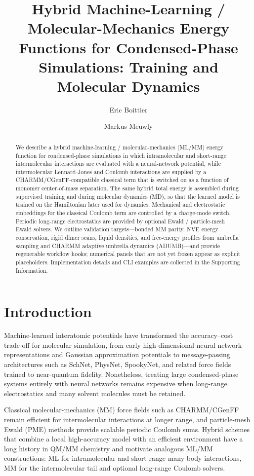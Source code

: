 \documentclass[journal=jctc,manuscript=article]{achemso}
\author{Eric Boittier}
\affiliation{Department of Chemistry, University of Basel, Klingelbergstrasse 80, CH-4056 Basel, Switzerland}
\author{Markus Meuwly}
\affiliation{Department of Chemistry, University of Basel, Klingelbergstrasse 80, CH-4056 Basel, Switzerland}
\title{Hybrid Machine-Learning / Molecular-Mechanics Energy Functions for Condensed-Phase Simulations: Training and Molecular Dynamics}
\begin{document}
\begin{abstract}
We describe a hybrid machine-learning / molecular-mechanics (ML/MM) energy
function for condensed-phase simulations in which intramolecular and
short-range intermolecular interactions are evaluated with a neural-network
potential, while intermolecular Lennard-Jones and Coulomb interactions are
supplied by a CHARMM/CGenFF-compatible classical term that is switched on as a
function of monomer center-of-mass separation. The same hybrid total energy is
assembled during supervised training and during molecular dynamics (MD), so
that the learned model is trained on the Hamiltonian later used for dynamics.
Mechanical and electrostatic embeddings for the classical Coulomb term are
controlled by a charge-mode switch. Periodic long-range electrostatics are
provided by optional Ewald / particle-mesh Ewald solvers. We outline validation
targets---bonded MM parity, NVE energy conservation, rigid dimer scans, liquid
densities, and free-energy profiles from umbrella sampling and CHARMM adaptive
umbrella dynamics (ADUMB)---and provide regenerable workflow hooks; numerical
panels that are not yet frozen appear as explicit placeholders. Implementation
details and CLI examples are collected in the Supporting Information.
\end{abstract}

\tableofcontents
\clearpage

\section{Introduction}

Machine-learned interatomic potentials have transformed the accuracy--cost
trade-off for molecular simulation, from early high-dimensional neural network
representations\cite{Behler2007,Behler2021} and Gaussian approximation
potentials\cite{Bartok2010,Deringer2021} to message-passing architectures such
as SchNet,\cite{Schutt2018} PhysNet,\cite{Unke2019PhysNet}
SpookyNet,\cite{Unke2021SpookyNet} and related force fields trained to
near-quantum fidelity.\cite{Chmiela2018,Unke2021ChemRev,Keith2021,Ko2021}
Nonetheless, treating large condensed-phase systems entirely with neural
networks remains expensive when long-range electrostatics and many solvent
molecules must be retained.

Classical molecular-mechanics (MM) force fields such as
CHARMM/CGenFF\cite{Brooks2009CHARMM,Vanommeslaeghe2010,Mackerell2004} remain
efficient for intermolecular interactions at longer range, and
particle-mesh Ewald (PME) methods provide scalable periodic
Coulomb sums.\cite{Ewald1921,Darden1993,Essmann1995} Hybrid schemes that
combine a local high-accuracy model with an efficient environment have a long
history in QM/MM chemistry\cite{Warshel1976,Senn2009,Lin2014} and motivate
analogous ML/MM constructions: ML for intramolecular and short-range many-body
interactions, MM for the intermolecular tail and optional long-range Coulomb
solvers.\cite{Unke2019PhysNet,KARML2026}
\end{document}
